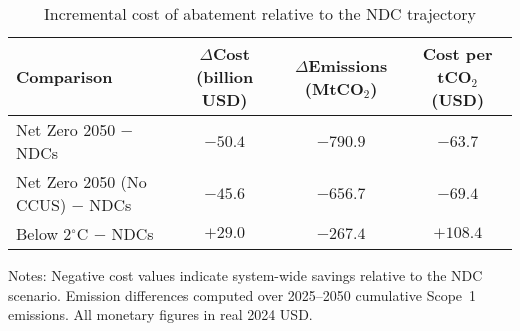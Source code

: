 \begin{table}[ht]
  \centering
  \caption{Incremental cost of abatement relative to the NDC trajectory}
  \label{tab:cost-abatement}
  \begin{threeparttable}
  \begin{tabular}{@{}lccc@{}}
    \toprule
    Comparison & $\Delta$Cost (billion USD) & $\Delta$Emissions (MtCO$_2$) & Cost per tCO$_2$ (USD) \\
    \midrule
    Net Zero 2050 $-$ NDCs & $-50.4$ & $-790.9$ & $-63.7$ \\
    Net Zero 2050 (No CCUS) $-$ NDCs & $-45.6$ & $-656.7$ & $-69.4$ \\
    Below 2$^\circ$C $-$ NDCs & $+29.0$ & $-267.4$ & $+108.4$ \\
    \bottomrule
  \end{tabular}
  \begin{tablenotes}
    \footnotesize
    \item Notes: Negative cost values indicate system-wide savings relative to the NDC scenario. Emission differences computed over 2025--2050 cumulative Scope~1 emissions. All monetary figures in real 2024 USD.
  \end{tablenotes}
  \end{threeparttable}
\end{table}
